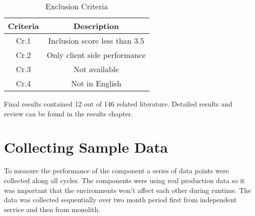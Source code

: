 \begin{table}[ht!]
    \begin{tabular}{|c c|} 
        \hline
        Criteria & Description \\ [0.5ex] 
        \hline\hline
        Cr.1 & Inclusion score less than 3.5 \\
        
        Cr.2 & Only client side performance  \\
        
        Cr.3 & Not available \\
        
        Cr.4 & Not in English \\
        \hline
    \end{tabular}    
    \caption{Exclusion Criteria}
    \label{table:literature:exclusionCriteria}
\end{table}

Final results contained 12 out of 146 related literature.
Detailed results and review can be found in the results chapter.

\section{Collecting Sample Data}
To measure the performance of the component a series of data points were collected along all cycles.
The components were using real production data so it was important that the environments won't affect each other during runtime.
The data was collected sequentially over two month period first from independent service and then from monolith.

